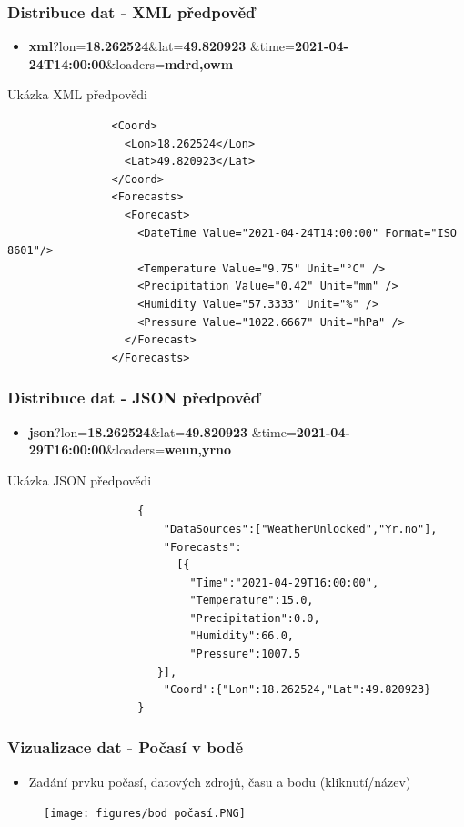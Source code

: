 \documentclass{beamer}
\begin{document}
	\begin{frame}[fragile]
		\frametitle{Distribuce dat - XML předpověď}
		
		\begin{itemize}
			\item \textbf{xml}?lon=\textbf{18.262524}\&lat=\textbf{49.820923}
			\&time=\textbf{2021-04-24T14:00:00}\&loaders=\textbf{mdrd,owm}
		\end{itemize}
		
		\begin{exampleblock}{Ukázka XML předpovědi}
			\begin{verbatim}
				<Coord>
				  <Lon>18.262524</Lon>
				  <Lat>49.820923</Lat>
				</Coord>
				<Forecasts>
				  <Forecast>
				    <DateTime Value="2021-04-24T14:00:00" Format="ISO 8601"/>
				    <Temperature Value="9.75" Unit="°C" />
				    <Precipitation Value="0.42" Unit="mm" />
				    <Humidity Value="57.3333" Unit="%" />
				    <Pressure Value="1022.6667" Unit="hPa" />
				  </Forecast>
				</Forecasts>
			\end{verbatim}
		\end{exampleblock}
	\end{frame}
	
	\begin{frame}[fragile]
		\frametitle{Distribuce dat - JSON předpověď}
			
			\begin{itemize}
				\item \textbf{json}?lon=\textbf{18.262524}\&lat=\textbf{49.820923}
				\&time=\textbf{2021-04-29T16:00:00}\&loaders=\textbf{weun,yrno}
			\end{itemize}
			
			\begin{exampleblock}{Ukázka JSON předpovědi}
				\begin{verbatim}
					{
					    "DataSources":["WeatherUnlocked","Yr.no"],
					    "Forecasts":
					      [{
					        "Time":"2021-04-29T16:00:00",
					        "Temperature":15.0,
					        "Precipitation":0.0,
					        "Humidity":66.0,
					        "Pressure":1007.5
				       }],
					    "Coord":{"Lon":18.262524,"Lat":49.820923}
					}
				\end{verbatim}
			\end{exampleblock}
	\end{frame}

	\begin{frame}
		\frametitle{Vizualizace dat - Počasí v bodě}
		
		\begin{itemize}
			\item Zadání prvku počasí, datových zdrojů, času a bodu (kliknutí/název)
		\end{itemize}
	
		\begin{figure}
			
			\texttt{[image: figures/bod počasí.PNG]}
			
		\end{figure}
	
	\end{frame}
\end{document}
